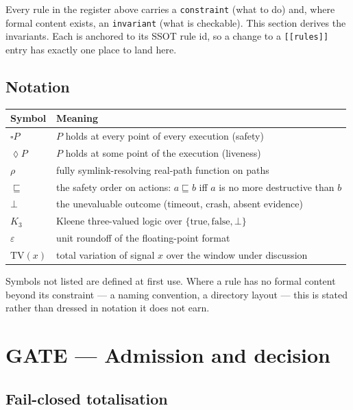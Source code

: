 \documentclass[11pt]{article}
\providecommand{\Box}{\square}
\providecommand{\Diamond}{\lozenge}
\begin{document}
Every rule in the register above carries a \texttt{constraint} (what to do) and,
where formal content exists, an \texttt{invariant} (what is checkable). This
section derives the invariants. Each is anchored to its SSOT rule id, so a
change to a \texttt{[[rules]]} entry has exactly one place to land here.

\subsection*{Notation}

\begin{tabular}{@{}ll@{}}
\toprule
Symbol & Meaning \\
\midrule
$\Box P$        & $P$ holds at every point of every execution (safety) \\
$\Diamond P$    & $P$ holds at some point of the execution (liveness) \\
$\rho$          & fully symlink-resolving real-path function on paths \\
$\sqsubseteq$   & the safety order on actions: $a \sqsubseteq b$ iff $a$ is no more destructive than $b$ \\
$\bot$          & the unevaluable outcome (timeout, crash, absent evidence) \\
$K_3$           & Kleene three-valued logic over $\{\mathrm{true}, \mathrm{false}, \bot\}$ \\
$\varepsilon$   & unit roundoff of the floating-point format \\
$\mathrm{TV}(x)$& total variation of signal $x$ over the window under discussion \\
\bottomrule
\end{tabular}

\medskip
Symbols not listed are defined at first use. Where a rule has no formal content
beyond its constraint --- a naming convention, a directory layout --- this is
stated rather than dressed in notation it does not earn.

\section{GATE --- Admission and decision}

\subsection{Fail-closed totalisation}
\label{lbl:HS-GATE-01}
\end{document}
